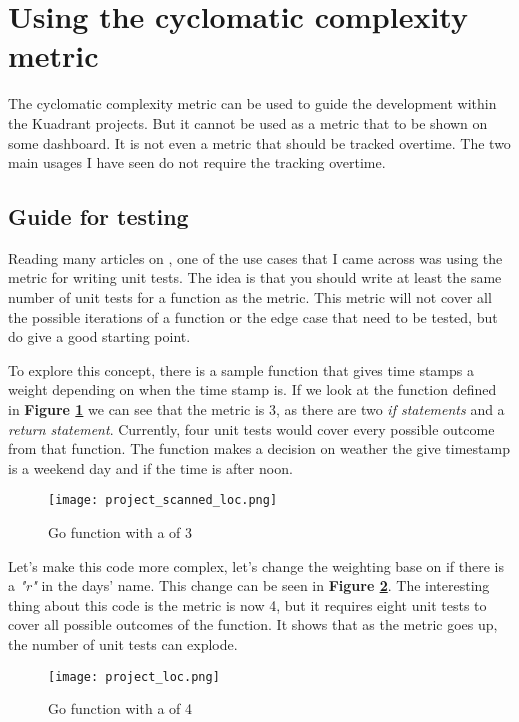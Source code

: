 \section{Using the cyclomatic complexity metric}

The cyclomatic complexity metric can be used to guide the development within the Kuadrant projects.
But it cannot be used as a metric that to be shown on some dashboard.
It is not even a metric that should be tracked overtime.
The two main usages I have seen do not require the tracking overtime.

\subsection{Guide for testing}
Reading many articles on \ccnsp, one of the use cases that I came across was using the metric for writing unit tests.
The idea is that you should write at least the same number of unit tests for a function as the \cc metric.
This metric will not cover all the possible iterations of a function or the edge case that need to be tested, but do give a good starting point.

To explore this concept, there is a sample function that gives time stamps a weight depending on when the time stamp is.
If we look at the function defined in \textbf{Figure \ref{fig:go_ex_1}} we can see that the \cc metric is 3, as there are two \textit{if statements} and a \textit{return statement}.
Currently, four unit tests would cover every possible outcome from that function.
The function makes a decision on weather the give timestamp is a weekend day and if the time is after noon.

\begin{figure}
	\texttt{[image: project\_scanned\_loc.png]}
	\caption{Go function with a \cc of 3}
	\label{fig:go_ex_1}
\end{figure}

Let's make this code more complex, let's change the weighting base on if there is a \textit{"r"} in the days' name.
This change can be seen in \textbf{Figure \ref{fig:go_ex_2}}.
The interesting thing about this code is the \cc metric is now 4, but it requires eight unit tests to cover all possible outcomes of the function.
It shows that as the \cc metric goes up, the number of unit tests can explode.

\begin{figure}
	\texttt{[image: project\_loc.png]}
	\caption{Go function with a \cc of 4}
	\label{fig:go_ex_2}
\end{figure}

